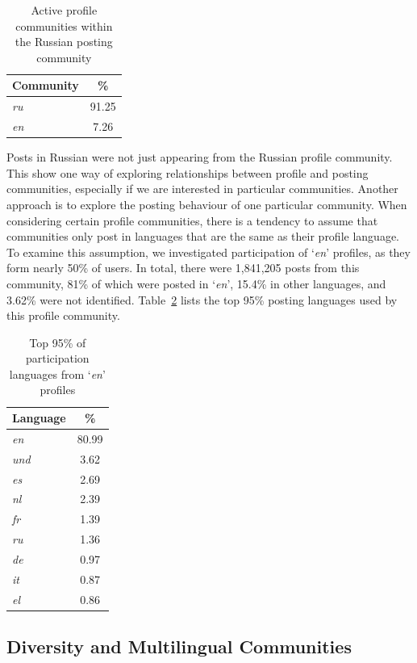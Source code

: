 \documentclass{llncs}
\begin{document}
{\begin{table}[!htb]
\centering
\begin{tabular}{@{}lc}
\toprule
\textbf{Community} & \textbf{\%} \\ 
\midrule
{\emph{ru}} & 91.25 \\
{\emph{en}} & 7.26 \\
\bottomrule
\end{tabular}
\caption{Active profile communities within the Russian posting community}
\label{tbl:russian}
\end{table}

Posts in Russian were not just appearing from the Russian profile
community. This show one way of exploring relationships between
profile and posting communities, especially if we are interested in
particular communities. Another approach is to explore the posting
behaviour of one particular community. When considering certain
profile communities, there is a tendency to assume that communities
only post in languages that are the same as their profile language. To
examine this assumption, we investigated participation of
`{\emph{en}}' profiles, as they form nearly 50\% of users. In total,
there were 1,841,205 posts from this community, 81\% of which were
posted in `{\emph{en}}', 15.4\% in other languages, and 3.62\% were
not identified. Table~\ref{tbl:enpartlangs} lists the top 95\% posting
languages used by this profile community.

\begin{table}[!htb]
\centering
\begin{tabular}{@{}lc}
\toprule
\textbf{Language} & \textbf{\%} \\ 
\midrule
{\emph{en}} & 80.99 \\
{\emph{und}} & 3.62 \\
{\emph{es}} & 2.69 \\
{\emph{nl}} & 2.39 \\
{\emph{fr}} & 1.39 \\
{\emph{ru}} & 1.36 \\
{\emph{de}} & 0.97 \\
{\emph{it}} & 0.87 \\ 
{\emph{el}} & 0.86 \\ 
\bottomrule
\end{tabular}
\caption{Top 95\% of participation languages from `{\emph{en}}' profiles}
\label{tbl:enpartlangs}
\end{table}

\subsection{Diversity and Multilingual Communities}

}
\end{document}
